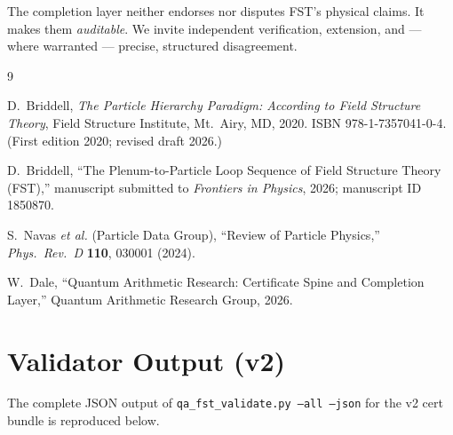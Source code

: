 \documentclass[12pt,a4paper]{article}
\begin{document}
The completion layer neither endorses nor disputes FST's physical
claims. It makes them \emph{auditable}. We invite independent
verification, extension, and --- where warranted --- precise,
structured disagreement.


\begin{thebibliography}{9}

D.~Briddell,
\emph{The Particle Hierarchy Paradigm: According to Field Structure Theory},
Field Structure Institute, Mt.~Airy, MD, 2020.
ISBN 978-1-7357041-0-4. (First edition 2020; revised draft 2026.)

D.~Briddell,
``The Plenum-to-Particle Loop Sequence of Field Structure Theory (FST),''
manuscript submitted to \emph{Frontiers in Physics}, 2026;
manuscript ID 1850870.

S.~Navas \emph{et al.} (Particle Data Group),
``Review of Particle Physics,''
\emph{Phys.\ Rev.\ D} \textbf{110}, 030001 (2024).

W.~Dale,
``Quantum Arithmetic Research: Certificate Spine and Completion Layer,''
Quantum Arithmetic Research Group, 2026.

\end{thebibliography}


\appendix

\section{Validator Output (v2)}

The complete JSON output of \texttt{qa\_fst\_validate.py --all --json}
for the v2 cert bundle is reproduced below.
\end{document}

